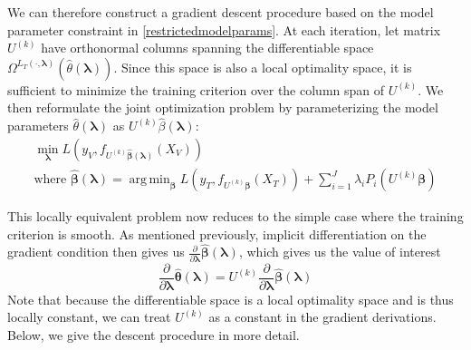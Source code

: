\documentclass[10pt,letterpaper]{article}
\DeclareMathOperator*{\argmin}{arg\,min}
\begin{document}
We can therefore construct a gradient descent procedure based on the model parameter constraint in \eqref{restrictedmodelparams}. At each iteration, let matrix $U^{(k)}$ have orthonormal columns spanning the differentiable space $\Omega^{L_T(\cdot, \boldsymbol{\lambda})}(\hat \theta(\boldsymbol{\lambda}))$. Since this space is also a local optimality space, it is sufficient to minimize the training criterion over the column span of $U^{(k)}$. We then reformulate the joint optimization problem by parameterizing the model parameters $\hat \theta(\boldsymbol{\lambda})$ as $U^{(k)} \hat \beta(\boldsymbol{\lambda})$:
\begin{equation}
\begin{array}{c}
\min_{\boldsymbol \lambda} L(y_V, f_{U^{(k)} \hat{\boldsymbol \beta} (\boldsymbol \lambda) }(X_V)) \\
\text{where } \hat{\boldsymbol \beta} (\boldsymbol \lambda) =
\argmin_{\boldsymbol \beta}
L(y_T, f_{U^{(k)} \boldsymbol \beta}(X_T))
+ \sum\limits_{i=1}^J \lambda_i P_i( U^{(k)} \boldsymbol \beta)
\end{array}
\end{equation}

This locally equivalent problem now reduces to the simple case where the training criterion is smooth. As mentioned previously, implicit differentiation on the gradient condition then gives us $\frac{\partial}{\partial \boldsymbol \lambda}\hat{\boldsymbol \beta}(\boldsymbol \lambda)$, which gives us the value of interest
\begin{equation}
\frac{\partial}{\partial \boldsymbol \lambda}\hat{\boldsymbol \theta}(\boldsymbol \lambda) = U^{(k)} \frac{\partial}{\partial \boldsymbol \lambda}\hat{\boldsymbol \beta}(\boldsymbol \lambda)
\end{equation}
Note that because the differentiable space is a local optimality space and is thus locally constant, we can treat $U^{(k)}$ as a constant in the gradient derivations. Below, we give the descent procedure in more detail.
\end{document}
